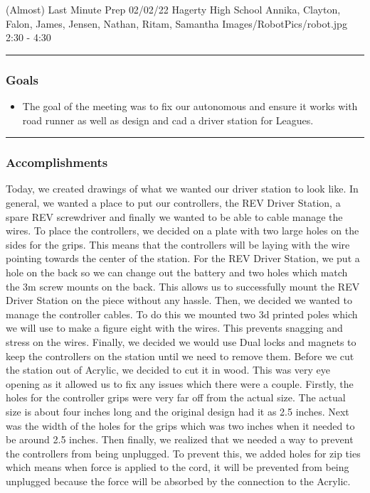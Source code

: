 \insertmeeting 
	{(Almost) Last Minute Prep} 
	{02/02/22} 
	{Hagerty High School}
	{Annika, Clayton, Falon, James, Jensen, Nathan, Ritam, Samantha}
	{Images/RobotPics/robot.jpg}
	{2:30 - 4:30}
	
\noindent\hfil\rule{\textwidth}{.4pt}\hfil
\subsubsection*{Goals}
\begin{itemize}
    \item The goal of the meeting was to fix our autonomous and ensure it works with road runner as well as design and cad a driver station for Leagues.   

\end{itemize} 

\noindent\hfil\rule{\textwidth}{.4pt}\hfil

\subsubsection*{Accomplishments}
Today, we created drawings of what we wanted our driver station to look like. In general, we wanted a place to put our controllers, the REV Driver Station, a spare REV screwdriver and finally we wanted to be able to cable manage the wires. To place the controllers, we decided on a plate with two large holes on the sides for the grips. This means that the controllers will be laying with the wire pointing towards the center of the station. For the REV Driver Station, we put a hole on the back so we can change out the battery and two holes which match the 3m screw mounts on the back. This allows us to successfully mount the REV Driver Station on the piece without any hassle. Then, we decided we wanted to manage the controller cables. To do this we mounted two 3d printed poles which we will use to make a figure eight with the wires. This prevents snagging and stress on the wires. Finally, we decided we would use Dual locks and magnets to keep the controllers on the station until we need to remove them. Before we cut the station out of Acrylic, we decided to cut it in wood. This was very eye opening as it allowed us to fix any issues which there were a couple. Firstly, the holes for the controller grips were very far off from the actual size. The actual size is about four inches long and the original design had it as 2.5 inches. Next was the width of the holes for the grips which was two inches when it needed to be around 2.5 inches. Then finally, we realized that we needed a way to prevent the controllers from being unplugged. To prevent this, we added holes for zip ties which means when force is applied to the cord, it will be prevented from being unplugged because the force will be absorbed by the connection to the Acrylic.




